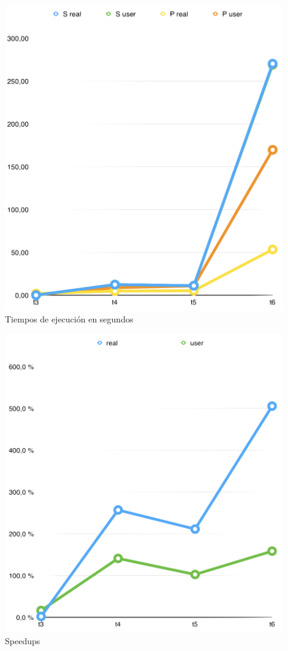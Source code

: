 \documentclass[10pt]{extarticle}
\begin{document}
\begin{center}
 \includegraphics[width=12cm]{imgs/graph_seconds.png}\\
 \footnotesize{Tiempos de ejecución en segundos}\\
\end{center}

\begin{center}
 \includegraphics[width=12cm]{imgs/graph_speedup.png}\\
 \footnotesize{Speedups}\\
\end{center}
\end{document}
